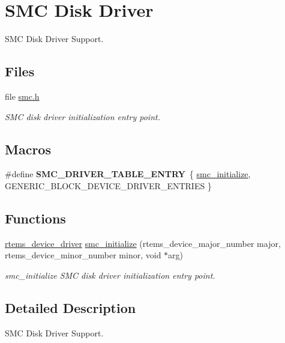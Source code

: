 \hypertarget{group__smdk2410__smc}{}\section{S\+MC Disk Driver}
\label{group__smdk2410__smc}


S\+MC Disk Driver Support.  


\subsection*{Files}
\begin{DoxyCompactItemize}
\item 
file \mbox{\hyperlink{smdk2410_2include_2smc_8h}{smc.\+h}}
\begin{DoxyCompactList}\small\item\em S\+MC disk driver initialization entry point. \end{DoxyCompactList}\end{DoxyCompactItemize}
\subsection*{Macros}
\begin{DoxyCompactItemize}
\item 
\mbox{\label{group__smdk2410__smc_ga58f551322bef1894c255058ced0cc529}} 
\#define {\bfseries S\+M\+C\+\_\+\+D\+R\+I\+V\+E\+R\+\_\+\+T\+A\+B\+L\+E\+\_\+\+E\+N\+T\+RY}~\{ \mbox{\hyperlink{group__smdk2410__smc_gad3ba19c46429cadc084f8d8460faa302}{smc\+\_\+initialize}}, G\+E\+N\+E\+R\+I\+C\+\_\+\+B\+L\+O\+C\+K\+\_\+\+D\+E\+V\+I\+C\+E\+\_\+\+D\+R\+I\+V\+E\+R\+\_\+\+E\+N\+T\+R\+I\+ES \}
\end{DoxyCompactItemize}
\subsection*{Functions}
\begin{DoxyCompactItemize}
\item 
\mbox{\label{group__smdk2410__smc_gad3ba19c46429cadc084f8d8460faa302}} 
\mbox{\hyperlink{group__ClassicStatus_ga545d41846817eaba6143d52ee4d9e9fe}{rtems\+\_\+device\+\_\+driver}} \mbox{\hyperlink{group__smdk2410__smc_gad3ba19c46429cadc084f8d8460faa302}{smc\+\_\+initialize}} (rtems\+\_\+device\+\_\+major\+\_\+number major, rtems\+\_\+device\+\_\+minor\+\_\+number minor, void $\ast$arg)
\begin{DoxyCompactList}\small\item\em smc\+\_\+initialize S\+MC disk driver initialization entry point. \end{DoxyCompactList}\end{DoxyCompactItemize}


\subsection{Detailed Description}
S\+MC Disk Driver Support. 

